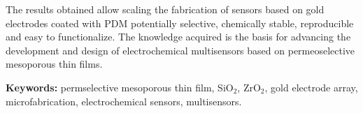 The results obtained allow scaling the fabrication of sensors based on gold electrodes coated with PDM potentially selective, chemically stable, reproducible and easy to functionalize. The knowledge acquired is the basis for advancing the development and design of electrochemical multisensors based on permeoselective mesoporous thin films.

\vspace*{\fill}

\vfill

\noindent\textbf{Keywords:} permselective mesoporous thin film, SiO$_2$, ZrO$_2$, gold electrode array, microfabrication, electrochemical sensors, multisensors.

\cleardoublepage

